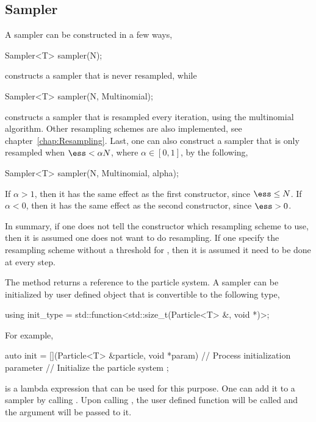 \subsection{Sampler}
\label{sub:Sampler}

A sampler can be constructed in a few ways,
\begin{cppcode}
  Sampler<T> sampler(N);
\end{cppcode}
constructs a sampler that is never resampled, while
\begin{cppcode}
  Sampler<T> sampler(N, Multinomial);
\end{cppcode}
constructs a sampler that is resampled every iteration, using the multinomial
algorithm. Other resampling schemes are also implemented, see
chapter~\ref{chap:Resampling}. Last, one can also construct a sampler that is
only resampled when $\ess < \alpha N$, where $\alpha\in[0, 1]$, by the
following,
\begin{cppcode}
  Sampler<T> sampler(N, Multinomial, alpha);
\end{cppcode}
If $\alpha > 1$, then it has the same effect as the first constructor, since
$\ess \le N$. If $\alpha < 0$, then it has the same effect as the second
constructor, since $\ess > 0$.

In summary, if one does not tell the constructor which resampling scheme to
use, then it is assumed one does not want to do resampling. If one specify the
resampling scheme without a threshold for \ess, then it is assumed it need to
be done at every step.

The method  returns a reference to the particle
system. A sampler can be initialized by user defined object that is convertible
to the following type,
\begin{cppcode}
  using init_type = std::function<std::size_t(Particle<T> &, void *)>;
\end{cppcode}
For example,
\begin{cppcode}
  auto init = [](Particle<T> &particle, void *param) {
      // Process initialization parameter
      // Initialize the particle system
  };
\end{cppcode}
is a \cppoo lambda expression that can be used for this purpose. One can add it
to a sampler by calling . Upon calling
, the user defined function
 will be called and the argument  will be
passed to it.


